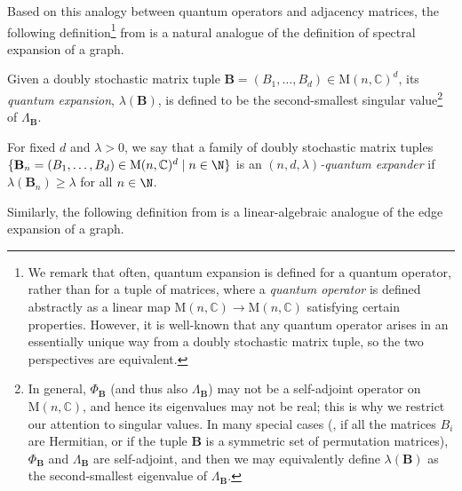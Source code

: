 \documentclass{toc}
\theoremstyle{plain}
\numberwithin{equation}{section}
\theoremstyle{definition}
\newcommand{\bC}{\mathbb{C}}
\newcommand{\M}{\mathrm{M}}
\newcommand{\tuple}[1]{\mathbf{#1}}
\newcommand{\vB}{\tuple{B}}
\begin{document}
Based on this analogy between quantum operators and adjacency matrices, the following definition\footnote{We remark that often, quantum expansion is defined for a quantum operator, rather than for a tuple of matrices, where a \emph{quantum operator} is defined abstractly as a linear map $\M(n,\bC) \to \M(n,\bC)$ satisfying certain properties. However, it is well-known \cite[Theorem 8.2]{NC00} that any quantum operator arises in an essentially unique way from a doubly stochastic matrix tuple, so the two perspectives are equivalent.} from \cite{PhysRevA.76.032315,BT07} is a natural analogue of the definition of spectral expansion of a graph.
\begin{definition}
    Given a doubly stochastic matrix tuple $\vB=(B_1,\dots,B_d) \in \M(n,\bC)^d$, its \emph{quantum expansion}, $\lambda(\vB)$, is defined to be the second-smallest singular value\footnote{In general, $\Phi_\vB$ (and thus also $\Lambda_\vB$) may not be a self-adjoint operator on $\M(n,\bC)$, and hence its eigenvalues may not be real; this is why we restrict our attention to singular values. In many special cases (\eg, if all the matrices $B_i$ are Hermitian, or if the tuple $\vB$ is a symmetric set of permutation matrices), $\Phi_\vB$ and $\Lambda_\vB$ are self-adjoint, and then we may equivalently define $\lambda(\vB)$ as the second-smallest eigenvalue of $\Lambda_\vB$.} of $\Lambda_\vB$.

    For fixed $d$ and $\lambda>0$, we say that a family of doubly stochastic matrix tuples $\{\vB_n=(B_1, \dots, B_d)\in \M(n, \bC)^d\mid n\in \N\}$ is an \emph{$(n,d,\lambda)$-quantum expander} if $\lambda(\vB_n)\geq \lambda$ for all $n\in\N$. 
\end{definition}

Similarly, the following definition from \cite{PhysRevA.76.032315} is a linear-algebraic analogue of the edge expansion of a graph.
\end{document}
